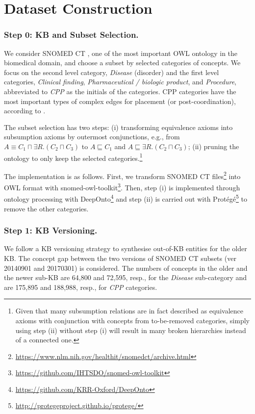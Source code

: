 \documentclass[sigconf]{acmart}
\begin{document}
\section{Dataset Construction}

\subsubsection*{Step 0: KB and Subset Selection.}
We consider SNOMED CT \cite{donnelly2006snomed}, one of the most important OWL ontology in the biomedical domain, and choose a subset by selected categories of concepts. We focus on the second level category, \textit{Disease} (disorder) and the first level categories, \textit{Clinical finding}, \textit{Pharmaceutical / biologic product}, and \textit{Procedure}, abbreviated to \textit{CPP} as the initials of the categories. CPP categories have the most important types of complex edges for placement (or post-coordination), according to \citet{kate2020}.

The subset selection has two steps: (i) transforming equivalence axioms into subsumption axioms by outermost conjunctions, e.g., from $A \equiv C_1 \sqcap \exists R.(C_2 \sqcap C_3)$ to $A \sqsubseteq C_1$ and $A \sqsubseteq \exists R.(C_2 \sqcap C_3)$; (ii) pruning the ontology to only keep the selected categories.\footnote{Given that many subsumption relations are in fact described as equivalence axioms with conjunction with concepts from to-be-removed categories, simply using step (ii) without step (i) will result in many broken hierarchies instead of a connected one.}

The implementation is as follows. First, we transform SNOMED CT files\footnote{\url{https://www.nlm.nih.gov/healthit/snomedct/archive.html}} into OWL format with snomed-owl-toolkit\footnote{\url{https://github.com/IHTSDO/snomed-owl-toolkit}}. Then, step (i) is implemented through ontology processing with DeepOnto\footnote{\url{https://github.com/KRR-Oxford/DeepOnto}} and step (ii) is carried out with Protégé\footnote{\url{http://protegeproject.github.io/protege/}} to remove the other categories.

\subsubsection*{Step 1: KB Versioning.}
We follow a KB versioning strategy \cite{dong2023NIL,Iurshina2022nilk} to synthesise out-of-KB entities for the older KB. The concept gap between the two versions of SNOMED CT subsets (ver 20140901 and 20170301) is considered. The numbers of concepts in the older and the newer sub-KB are 64,800 and 72,595, resp., for the \textit{Disease} sub-category and are 175,895 and 188,988, resp., for \textit{CPP} categories.
\end{document}
